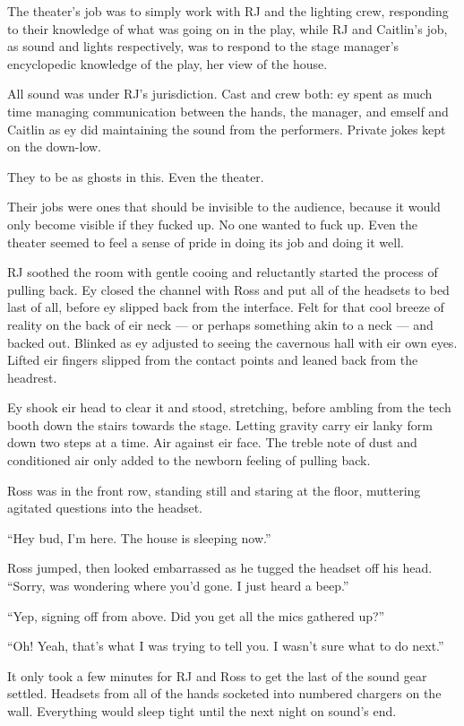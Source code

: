 The theater's job was to simply work with RJ and the lighting crew, responding to their knowledge of what was going on in the play, while RJ and Caitlin's job, as sound and lights respectively, was to respond to the stage manager's encyclopedic knowledge of the play, her view of the house.

All sound was under RJ's jurisdiction. Cast and crew both: ey spent as much time managing communication between the hands, the manager, and emself and Caitlin as ey did maintaining the sound from the performers. Private jokes kept on the down-low.

They to be as ghosts in this. Even the theater.

Their jobs were ones that should be invisible to the audience, because it would only become visible if they fucked up. No one wanted to fuck up. Even the theater seemed to feel a sense of pride in doing its job and doing it well.

RJ soothed the room with gentle cooing and reluctantly started the process of pulling back. Ey closed the channel with Ross and put all of the headsets to bed last of all, before ey slipped back from the interface. Felt for that cool breeze of reality on the back of eir neck — or perhaps something akin to a neck — and backed out. Blinked as ey adjusted to seeing the cavernous hall with eir own eyes. Lifted eir fingers slipped from the contact points and leaned back from the headrest.

Ey shook eir head to clear it and stood, stretching, before ambling from the tech booth down the stairs towards the stage. Letting gravity carry eir lanky form down two steps at a time. Air against eir face. The treble note of dust and conditioned air only added to the newborn feeling of pulling back.

Ross was in the front row, standing still and staring at the floor, muttering agitated questions into the headset.

``Hey bud, I'm here. The house is sleeping now.''

Ross jumped, then looked embarrassed as he tugged the headset off his head. ``Sorry, was wondering where you'd gone. I just heard a beep.''

``Yep, signing off from above. Did you get all the mics gathered up?''

``Oh! Yeah, that's what I was trying to tell you. I wasn't sure what to do next.''

It only took a few minutes for RJ and Ross to get the last of the sound gear settled. Headsets from all of the hands socketed into numbered chargers on the wall. Everything would sleep tight until the next night on sound's end.

